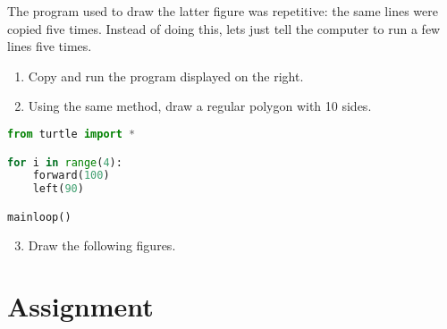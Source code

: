\documentclass[12pt]{article}
\begin{document}
\begin{multicols}{2}
  The program used to draw the latter figure was repetitive: the same lines were copied five times. Instead of doing this, lets just tell the computer to run a few lines five times.

\begin{enumerate}
  \item Copy and run the program displayed on the right.
  \item Using the same method, draw a regular polygon with 10 sides.
\end{enumerate}

\columnbreak

\begin{lstlisting}[language=python,frame=single]
from turtle import *

for i in range(4):
    forward(100)
    left(90)

mainloop()
\end{lstlisting}
\end{multicols}

\begin{enumerate}
  \setcounter{enumi}{2}
  \item Draw the following figures.
\end{enumerate}


\section{Assignment}

~
\end{document}
